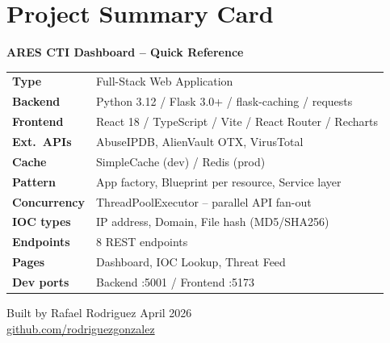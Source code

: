 \documentclass[11pt,a4paper]{article}
\begin{document}
\newpage

\section{Project Summary Card}

\begin{center}
\begin{mdframed}[linecolor=border,linewidth=1pt,roundcorner=8pt,
                 innerleftmargin=24pt,innerrightmargin=24pt,
                 innertopmargin=16pt,innerbottommargin=16pt]
\begin{center}
{\large\bfseries\color{sectionblue} ARES CTI Dashboard -- Quick Reference}
\end{center}
\vspace{0.4cm}
\begin{tabular}{ll}
\textbf{Type}        & Full-Stack Web Application \\[3pt]
\textbf{Backend}     & Python 3.12 / Flask 3.0+ / flask-caching / requests \\[3pt]
\textbf{Frontend}    & React 18 / TypeScript / Vite / React Router / Recharts \\[3pt]
\textbf{Ext.\ APIs}  & AbuseIPDB, AlienVault OTX, VirusTotal \\[3pt]
\textbf{Cache}       & SimpleCache (dev) / Redis (prod) \\[3pt]
\textbf{Pattern}     & App factory, Blueprint per resource, Service layer \\[3pt]
\textbf{Concurrency} & ThreadPoolExecutor -- parallel API fan-out \\[3pt]
\textbf{IOC types}   & IP address, Domain, File hash (MD5/SHA256) \\[3pt]
\textbf{Endpoints}   & 8 REST endpoints \\[3pt]
\textbf{Pages}       & Dashboard, IOC Lookup, Threat Feed \\[3pt]
\textbf{Dev ports}   & Backend :5001 / Frontend :5173 \\
\end{tabular}
\end{mdframed}
\end{center}

\vspace{1.5cm}
\begin{center}
\color{textmuted}\small
Built by Rafael Rodriguez \quad \textbullet \quad April 2026 \\[4pt]
\href{https://github.com/rodriguezgonzalez}{github.com/rodriguezgonzalez}
\end{center}
\end{document}
